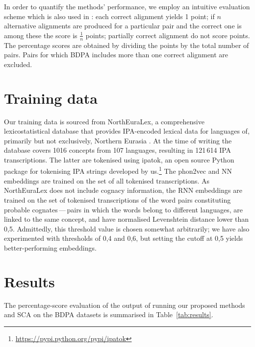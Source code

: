 \documentclass[a4paper]{report}
\begin{document}
In order to quantify the methods' performance, we employ an intuitive evaluation scheme which is also used in \citet{2002_Kondrak_Hirst}:
each correct alignment yields 1 point;
if $n$ alternative alignments are produced for a particular pair and the correct one is among these the score is $\frac{1}{n}$ points;
partially correct alignment do not score points.
The percentage scores are obtained by dividing the points by the total number of pairs.
Pairs for which BDPA includes more than one correct alignment are excluded.


\section{Training data}

Our training data is sourced from NorthEuraLex, a comprehensive lexicostatistical database
that provides IPA-encoded lexical data for languages of, primarily but not exclusively, Northern Eurasia \citep{2017_Dellert_Jäger}.
At the time of writing the database covers 1016 concepts from 107 languages, resulting in 121\,614 IPA transcriptions.
The latter are tokenised using ipatok, an open source Python package for tokenising IPA strings developed by us.\footnote{\url{https://pypi.python.org/pypi/ipatok}}
The phon2vec and NN embeddings are trained on the set of all tokenised transcriptions.
As NorthEuraLex does not include cognacy information,
the RNN embeddings are trained on the set of tokenised transcriptions of the word pairs constituting probable cognates\,---\,pairs
in which the words belong to different languages, are linked to the same concept, and have normalised Levenshtein distance lower than 0,5.
Admittedly, this threshold value is chosen somewhat arbitrarily;
we have also experimented with thresholds of 0,4 and 0,6, but setting the cutoff at 0,5 yields better-performing embeddings.


\section{Results}

The percentage-score evaluation of the output of running our proposed methods and SCA on the BDPA datasets is summarised in Table~\ref{tab:results}.
\end{document}

